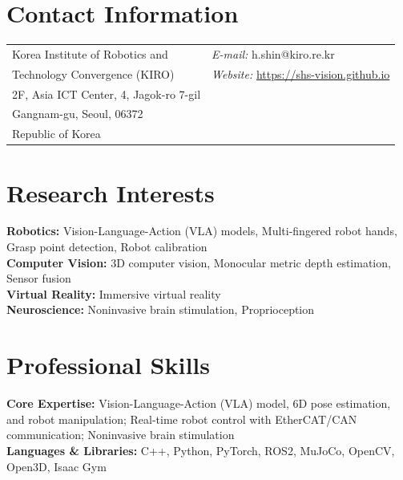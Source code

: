 \documentclass[margin,line]{res}
\begin{document}
\begin{resume}
\section{\sc Contact Information}
\vspace{.05in}
\begin{tabular}{@{}p{3in}p{4in}}
Korea Institute of Robotics and         & {\it E-mail:}  h.shin@kiro.re.kr\\
\quad Technology Convergence (KIRO)     & {\it Website:}  \href{https://shs-vision.github.io}{https://shs-vision.github.io}\\
2F, Asia ICT Center, 4, Jagok-ro 7-gil  & \\
Gangnam-gu, Seoul, 06372                & \\
Republic of Korea
\end{tabular}

\section{\sc Research Interests}
{\bf Robotics:} Vision-Language-Action (VLA) models, Multi-fingered robot hands, Grasp point detection, Robot calibration \\
{\bf Computer Vision:} 3D computer vision, Monocular metric depth estimation, Sensor fusion \\
{\bf Virtual Reality:} Immersive virtual reality \\
{\bf Neuroscience:} Noninvasive brain stimulation, Proprioception

\section{\sc Professional Skills} 
{\bf Core Expertise:} Vision-Language-Action (VLA) model, 6D pose estimation, and robot manipulation; Real-time robot control with EtherCAT/CAN communication; Noninvasive brain stimulation \\
{\bf Languages \& Libraries:} C++, Python, PyTorch, ROS2, MuJoCo, OpenCV, Open3D, Isaac Gym


\end{resume}
\end{document}
